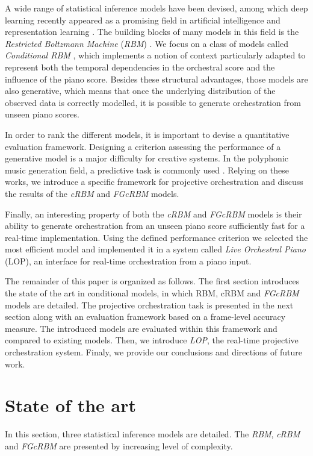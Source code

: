 \documentclass{article}
\begin{document}
A wide range of statistical inference models have been devised, among which deep learning recently appeared as a  promising field in artificial intelligence and representation learning \cite{bengio2013representation,LeCun:2015aa}. The building blocks of many models in this field is the \textit{Restricted Boltzmann Machine} (\textit{RBM}) \cite{hinton2006fast}.
We focus on a class of models called \textit{Conditional RBM} \cite{taylor2006modeling}, which implements a notion of context particularly adapted to represent both the temporal dependencies in the orchestral score and the influence of the piano score.
Besides these structural advantages, those models are also generative, which means that once the underlying distribution of the observed data is correctly modelled, it is possible to generate orchestration from unseen piano scores.

In order to rank the different models, it is important to devise a quantitative evaluation framework. Designing a criterion assessing the performance of a generative model is a major difficulty for creative systems. In the polyphonic music generation field, a predictive task is commonly used \cite{DBLP:journals/corr/YaoCVDD15,boulanger2012modeling,lavrenko2003polyphonic}. Relying on these works, we introduce a specific framework for projective orchestration and discuss the results of the \textit{cRBM} and \textit{FGcRBM} models.

Finally, an interesting property of both the \textit{cRBM} and \textit{FGcRBM} models is their ability to generate orchestration from an unseen piano score sufficiently fast for a real-time implementation.
Using the defined performance criterion we selected the most efficient model and implemented it in a system called \textit{Live Orchestral Piano} (LOP), an interface for real-time orchestration from a piano input.

The remainder of this paper is organized as follows. The first section introduces the state of the art in conditional models, in which RBM, cRBM and \textit{FGcRBM} models are detailed. The projective orchestration task is presented in the next section along with an evaluation framework based on a frame-level accuracy measure. The introduced models are evaluated within this framework and compared to existing models. Then, we introduce \textit{LOP}, the real-time projective orchestration system. Finaly, we provide our conclusions and directions of future work.

\section{State of the art}
In this section, three statistical inference models are detailed. The \textit{RBM}, \textit{cRBM} and \textit{FGcRBM} are presented by increasing level of complexity.
\end{document}
